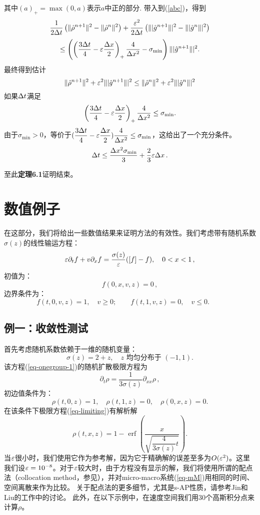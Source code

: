 其中$(a)_+=\max(0, a)$表示$a$中正的部分.
带入到(\ref{abc})，得到
$$
   \frac{1}{2\Delta t} \left(  \|\hat{\rho}^{n+1}\|^2-\|\hat{\rho}^n\|^2\right)
+ \frac{\varepsilon^2}{2\Delta t} \left( \||\hat{g}^{n+1}\||^2-\||\hat{g}^n\||^2 \right)
$$
$$
\leq \left( \left(\frac{3\Delta t}{4}- \varepsilon\frac{\Delta x}{2}\right)_{+} \frac{4}{\Delta x^2}-\sigma_{\text{min}}\right) \||\hat{g}^{n+1}\||^2.
$$
最终得到估计
\begin{equation*}
  \|\hat{\rho}^{n+1}\|^2+ \varepsilon^2\||\hat{g}^{n+1}\||^2 \leq \|\hat{\rho}^n\|^2+ \varepsilon^2\||\hat{g}^n\||^2
\end{equation*}
如果$\Delta t$满足
\begin{equation*}
  \left(\frac{3\Delta t}{4}- \varepsilon\frac{\Delta x}{2}\right)_+ \frac{4}{\Delta x^2}\leq\sigma_{\text{min}}.
\end{equation*}
由于$\sigma_{\text{min}} > 0$，等价于$(\dfrac{3\Delta t}{4}- \varepsilon\dfrac{\Delta x}{2})
\dfrac{4}{\Delta x^2}\leq\sigma_{\text{min}}$，这给出了一个充分条件。
\begin{equation*}
  \Delta t\leq \frac{\Delta x^2\sigma_{\text{min}}}{3} + \frac{2}{3}\varepsilon\Delta x\,.
\end{equation*}

至此{\bf 定理6.1}证明结束。

\section{数值例子}
\label{sec:num}
在这部分，我们将给出一些数值结果来证明方法的有效性。我们考虑带有随机系数$\sigma(z)$的线性输运方程：
\begin{equation}  \label{eq-onegroup-1}
\varepsilon \partial_t f + v \partial_x f = \frac{\sigma(z)}{\varepsilon}(\left[ f \right]-f),   \quad 0 < x < 1\,,
\end{equation}
初值为：
$$
   f(0,x,v,z) = 0\,,
$$
边界条件为：
$$
   f(t, 0, v, z) =1, \quad v\ge 0; \qquad   f(t, 1, v, z) = 0, \quad v\le 0. \qquad
$$

\subsection{例一：收敛性测试}
首先考虑随机系数依赖于一维的随机变量：
$$
\sigma(z) = 2 + z, \quad z \text{ 均匀分布于 } (-1, 1).
$$
该方程(\ref{eq-onegroup-1})的随机扩散极限方程为
\begin{equation}\label{eq-limiting} 
   \partial_t\rho = \frac1{3\sigma(z)} \partial_{xx}\rho\,,
\end{equation}
初边值条件为：
$$
  \rho(t,0,z) =1, \quad \rho(t,1,z) =0, \quad  \rho(0,x,z) =0.
$$
在该条件下极限方程(\ref{eq-limiting})有解析解
\begin{equation}\label{limiting solution}
   \rho(t,x,z) = 1 - \mbox{ erf } \left( \frac{x}{\sqrt{\dfrac{4}{3\sigma(z)} t}} \right).
\end{equation}
当$\varepsilon$很小时，我们使用它作为参考解，因为它于精确解的误差至多为$O(\varepsilon^2)$。这里我们设$\varepsilon = 10^{-8}$。对于$\varepsilon$较大时，由于方程没有显示的解，我们将使用所谓的配点法（collocation method，参见），并对micro-macro系统(\ref{eq-mM})用相同的时间、空间离散来作为比较。 关于配点法的更多细节，尤其是s-AP性质，请参考Jin和Liu的工作中的讨论。 此外，在以下示例中，在速度空间我们用30个高斯积分点来计算$\rho$。

